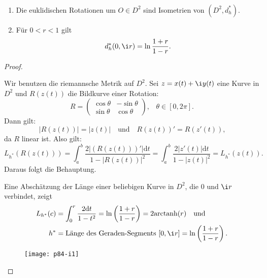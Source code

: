 \begin{theorem}
  \
  \begin{enumerate}
    \item Die euklidischen Rotationen um \( O \in D^2 \) sind Isometrien von \( (D^2, d_h^\ast) \).
    \item Für \( 0 < r < 1 \) gilt
    \begin{equation*}
      d_h^\ast(0,\i r) = \ln\frac{1+r}{1-r}\text{.}
    \end{equation*}
  \end{enumerate}
  \begin{proof}
    \
    \begin{enumerate}
      \item Wir benutzen die riemannsche Metrik auf \( D^2 \). Sei \( z = x(t) + \i y(t) \) eine Kurve in \( D^2 \) und \( R(z(t)) \) die Bildkurve einer Rotation:
      \begin{equation*}
        R = \begin{pmatrix}
          \cos \theta & - \sin \theta \\
          \sin \theta & \cos \theta
        \end{pmatrix}\text{,}\quad \theta \in [0,2\pi]\text{.}
      \end{equation*}
      Dann gilt:
      \begin{equation*}
        \left\vert R(z(t)) \right\vert = \left\vert z(t) \right\vert \quad \text{und} \quad R(z(t))' = R(z'(t))\text{,}
      \end{equation*}
      da \( R \) linear ist. Also gilt:
      \begin{equation*}
        L_{h^\ast}(R(z(t))) = \int_a^b \frac{2\left\vert (R(z(t)))' \right\vert\text{d}t}{1-\left\vert R(z(t)) \right\vert^2} = \int_a^b \frac{2\left\vert z'(t) \right\vert\text{d}t}{1-\left\vert z(t) \right\vert^2} = L_{h^\ast}(z(t))\text{.}
      \end{equation*}
      Daraus folgt die Behauptung.

      \begin{minipage}{.65\textwidth}
        \item Eine Abschätzung der Länge einer beliebigen Kurve in \( D^2 \), die \( 0 \) und \( \i r \) verbindet, zeigt
        \begin{align*}
          L_{h^\ast}(c) &= \int_0^r \frac{2\text{d}t}{1-t^2} = \ln\left( \frac{1+r}{1-r} \right) = 2\text{arctanh}(r) \quad \text{und} \\
          h^\ast &= \text{Länge des Geraden-Segments } [0,\i r] = \ln\left( \frac{1+r}{1-r} \right)\text{.}
        \end{align*}
      \end{minipage}
      \hfill
      \begin{minipage}{.325\textwidth}
        \begin{figure}[H]
          \texttt{[image: p84-i1]}
        \end{figure}
      \end{minipage}
    
    \end{enumerate}
  \end{proof}
\end{theorem}

